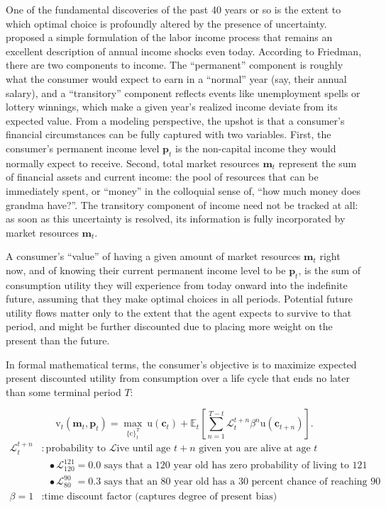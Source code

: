\documentclass{article}
\newcommand{\uFunc}{\mathrm{u}}
\newcommand{\cLvl}{\mathbf{c}}
\newcommand{\mLvl}{\mathbf{m}}
\newcommand{\pLvl}{\mathbf{p}}
\newcommand{\DiscFac}{\beta}
\newcommand{\cFunc}{\mathrm{c}}
\newcommand{\vFunc}{\mathrm{v}}
\newcommand{\Alive}{\mathcal{L}}
\newcommand{\Ex}{\mathbb{E}}
\begin{document}
One of the fundamental discoveries of the past 40 years or so is the extent to which optimal choice is profoundly altered by the presence of uncertainty.
\cite{friedman1957} proposed a simple formulation of the labor income process that remains an excellent description of annual income shocks even today.  According to Friedman, there are two components to income.
The ``permanent'' component is roughly what the consumer would expect to earn in a ``normal'' year (say, their annual salary), and a ``transitory'' component reflects events like unemployment spells or lottery winnings, which make a given year's realized income deviate from its expected value.
From a modeling perspective, the upshot is that a consumer's financial circumstances can be fully captured with two variables.
First, the consumer's permanent income level $\pLvl_{t}$ is the non-capital income they would normally expect to receive.
Second, total market resources $\mLvl_{t}$ represent the sum of financial assets and current income: the pool of resources that can be immediately spent, or ``money'' in the colloquial sense of, ``how much money does grandma have?''.
The transitory component of income need not be tracked at all: as soon as this uncertainty is resolved, its information is fully incorporated by market resources $\mLvl_{t}$.

A consumer's ``value'' of having a given amount of market resources $\mLvl_{t}$ right now, and of knowing their current permanent income level to be $\pLvl_{t}$, is the sum of consumption utility they will experience from today onward into the indefinite future, assuming that they make optimal choices in all periods.
Potential future utility flows matter only to the extent that the agent expects to survive to that period, and might be further discounted due to placing more weight on the present than the future.

In formal mathematical terms, the consumer's objective is to maximize expected present discounted utility from consumption over a life cycle that ends no later than some terminal period $T$:

\begin{equation}
\label{eq:lifecyclemax}
\pmb{\vFunc}_{t}(\mLvl_{t},\pLvl_{t}) = \max_{\{\cFunc\}_{t}^{T}} ~ \uFunc(\cLvl_{t})+\Ex_{t}\left[\sum_{n=1}^{T-t} \Alive_{t}^{t+n}{\DiscFac}^{n} \uFunc(\cLvl_{t+n}) \right].
\end{equation}
\begin{align*}
    \Alive _{t}^{t+n} & : \text{probability to } \Alive \text{ive until age $t+n$ given you are alive at age $t$}
    \\                   & {~~~}\bullet \Alive_{120}^{121} = 0.0 \text{ says that a 120 year old has zero probability of living to 121}
    \\                   & {~~~}\bullet \Alive_{80\phantom{1}}^{90\phantom{1}} = 0.3 \text{ says that an 80 year old has a 30 percent chance of reaching 90}
    \\ \DiscFac = 1        & : \text{time discount factor (captures degree of present bias)}
\end{align*}
\end{document}
